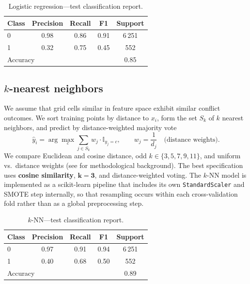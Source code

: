 \documentclass[11pt,a4paper]{article}
\begin{document}
\begin{table}[H]
  \centering
  \small
  \caption{Logistic regression---test classification report.}
  \begin{tabular}{lcccc}
    \toprule
    Class & Precision & Recall & F1 & Support \\
    \midrule
    0 & 0.98 & 0.86 & 0.91 & 6\,251 \\
    1 & 0.32 & 0.75 & 0.45 & 552 \\
    \midrule
    \multicolumn{4}{l}{Accuracy} & 0.85 \\
    \bottomrule
  \end{tabular}
\end{table}

\subsection{\texorpdfstring{$k$-nearest neighbors}{k-nearest neighbors}}
We assume that grid cells similar in feature space exhibit similar conflict outcomes. We sort training points by distance to $x_i$, form the set $S_k$ of $k$ nearest neighbors, and predict by distance-weighted majority vote
\[
\hat{y}_i = \arg\max_c \sum_{j \in S_k} w_j \cdot \mathbb{I}_{y_j=c}, \qquad
w_j = \frac{1}{d_j} \quad \text{(distance weights)}.
\]
We compare Euclidean and cosine distance, odd $k \in \{3,5,7,9,11\}$, and uniform vs.\ distance weights (see \textcite{knnlecture} for methodological background). The best specification uses \textbf{cosine similarity}, $\mathbf{k=3}$, and distance-weighted voting. The $k$-NN model is implemented as a scikit-learn pipeline that includes its own \texttt{StandardScaler} and SMOTE step internally, so that resampling occurs within each cross-validation fold rather than as a global preprocessing step.

\begin{table}[H]
  \centering
  \small
  \caption{$k$-NN---test classification report.}
  \begin{tabular}{lcccc}
    \toprule
    Class & Precision & Recall & F1 & Support \\
    \midrule
    0 & 0.97 & 0.91 & 0.94 & 6\,251 \\
    1 & 0.40 & 0.68 & 0.50 & 552 \\
    \midrule
    \multicolumn{4}{l}{Accuracy} & 0.89 \\
    \bottomrule
  \end{tabular}
\end{table}
\end{document}
